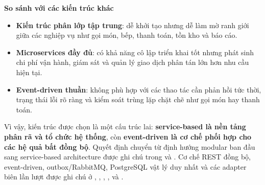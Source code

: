\textbf{So sánh với các kiến trúc khác}
\begin{itemize}
\item \textbf{Kiến trúc phân lớp tập trung}: dễ khởi tạo nhưng dễ làm mờ ranh giới giữa các nghiệp vụ như gọi món, bếp, thanh toán, tồn kho và báo cáo.
\item \textbf{Microservices đầy đủ}: có khả năng cô lập triển khai tốt nhưng phát sinh chi phí vận hành, giám sát và quản lý giao dịch phân tán lớn hơn nhu cầu hiện tại.

\item \textbf{Event-driven thuần}: không phù hợp với các thao tác cần phản hồi tức thời, trạng thái lỗi rõ ràng và kiểm soát trùng lặp chặt chẽ như gọi món hay thanh toán.
\end{itemize}


Vì vậy, kiến trúc được chọn là một cấu trúc lai: \textbf{service-based là nền tảng phân rã và tổ chức hệ thống}, còn \textbf{event-driven là cơ chế phối hợp cho các hệ quả bất đồng bộ}. Quyết định chuyển từ định hướng modular ban đầu sang service-based architecture được ghi chú trong  và . Cơ chế REST đồng bộ, event-driven, outbox/RabbitMQ, PostgreSQL vật lý duy nhất và các adapter biên lần lượt được ghi chú ở , , , ,  và .
